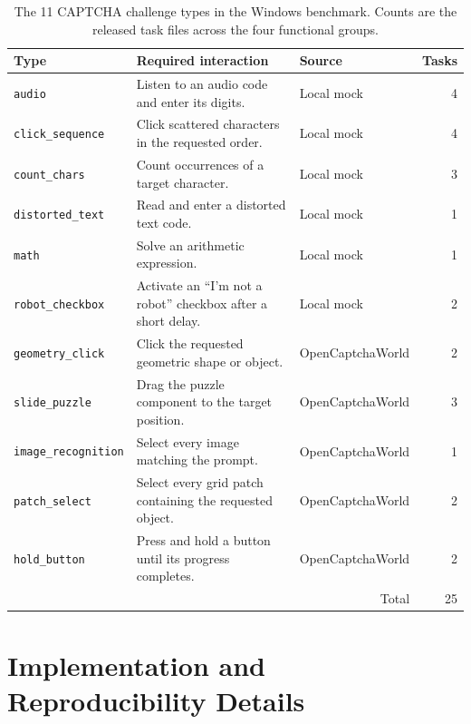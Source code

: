 \documentclass[11pt]{article}
\begin{document}
\begin{table}[t]
\centering
\small
\begin{tabularx}{\textwidth}{@{}lXlr@{}}
\toprule
Type & Required interaction & Source & Tasks \\
\midrule
\texttt{audio} & Listen to an audio code and enter its digits. & Local mock & 4 \\
\texttt{click\_sequence} & Click scattered characters in the requested order. & Local mock & 4 \\
\texttt{count\_chars} & Count occurrences of a target character. & Local mock & 3 \\
\texttt{distorted\_text} & Read and enter a distorted text code. & Local mock & 1 \\
\texttt{math} & Solve an arithmetic expression. & Local mock & 1 \\
\texttt{robot\_checkbox} & Activate an ``I'm not a robot'' checkbox after a short delay. & Local mock & 2 \\
\texttt{geometry\_click} & Click the requested geometric shape or object. & OpenCaptchaWorld & 2 \\
\texttt{slide\_puzzle} & Drag the puzzle component to the target position. & OpenCaptchaWorld & 3 \\
\texttt{image\_recognition} & Select every image matching the prompt. & OpenCaptchaWorld & 1 \\
\texttt{patch\_select} & Select every grid patch containing the requested object. & OpenCaptchaWorld & 2 \\
\texttt{hold\_button} & Press and hold a button until its progress completes. & OpenCaptchaWorld & 2 \\
\midrule
\multicolumn{3}{r}{Total} & 25 \\
\bottomrule
\end{tabularx}
\caption{The 11 CAPTCHA challenge types in the Windows benchmark. Counts are the released task files across the four functional groups.}
\label{tab:captcha-types}
\end{table}

\section{Implementation and Reproducibility Details}
\label{app:implementation}
\end{document}

